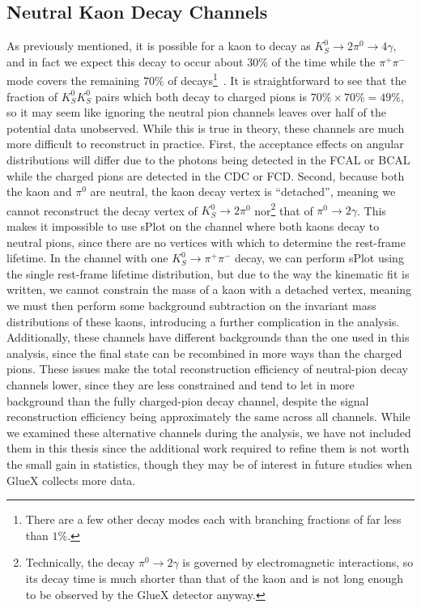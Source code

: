 \subsection{Neutral Kaon Decay Channels}\label{sub:neutral-kaon-decay-channels}
As previously mentioned, it is possible for a kaon to decay as $K_S^0 \to 2\pi^0 \to 4\gamma$, and in fact we expect this decay to occur about $30\%$ of the time while the $\pi^+\pi^-$ mode covers the remaining $70\%$ of decays\footnote{There are a few other decay modes each with branching fractions of far less than $1\%$.}~\cite{Zyla2020}. It is straightforward to see that the fraction of $K_S^0 K_S^0$ pairs which both decay to charged pions is $70\%\times 70\%=49\%$, so it may seem like ignoring the neutral pion channels leaves over half of the potential data unobserved. While this is true in theory, these channels are much more difficult to reconstruct in practice. First, the acceptance effects on angular distributions will differ due to the photons being detected in the FCAL or BCAL while the charged pions are detected in the CDC or FCD. Second, because both the kaon and $\pi^0$ are neutral, the kaon decay vertex is ``detached'', meaning we cannot reconstruct the decay vertex of $K_S^0 \to 2\pi^0$ nor\footnote{Technically, the decay $\pi^0 \to 2\gamma$ is governed by electromagnetic interactions, so its decay time is much shorter than that of the kaon and is not long enough to be observed by the GlueX detector anyway.} that of $\pi^0 \to 2\gamma$. This makes it impossible to use sPlot on the channel where both kaons decay to neutral pions, since there are no vertices with which to determine the rest-frame lifetime. In the channel with one $K_S^0\to\pi^+\pi^-$ decay, we can perform sPlot using the single rest-frame lifetime distribution, but due to the way the kinematic fit is written, we cannot constrain the mass of a kaon with a detached vertex, meaning we must then perform some background subtraction on the invariant mass distributions of these kaons, introducing a further complication in the analysis. Additionally, these channels have different backgrounds than the one used in this analysis, since the final state can be recombined in more ways than the charged pions. These issues make the total reconstruction efficiency of neutral-pion decay channels lower, since they are less constrained and tend to let in more background than the fully charged-pion decay channel, despite the signal reconstruction efficiency being approximately the same across all channels. While we examined these alternative channels during the analysis, we have not included them in this thesis since the additional work required to refine them is not worth the small gain in statistics, though they may be of interest in future studies when GlueX collects more data.

